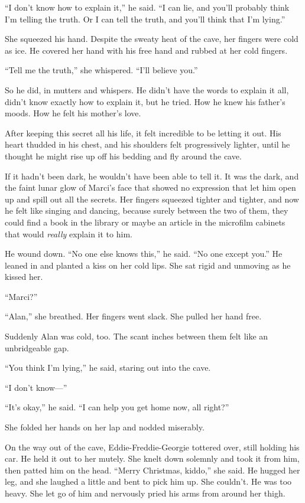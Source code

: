 \documentclass{article}
\begin{document}
``I don't know how to explain it,'' he said.  ``I can lie, and you'll
probably think I'm telling the truth.  Or I can tell the truth, and
you'll think that I'm lying.''

She squeezed his hand.  Despite the sweaty heat of the cave, her
fingers were cold as ice.  He covered her hand with his free hand and
rubbed at her cold fingers.

``Tell me the truth,'' she whispered.  ``I'll believe you.''

So he did, in mutters and whispers.  He didn't have the words to
explain it all, didn't know exactly how to explain it, but he tried. 
How he knew his father's moods.  How he felt his mother's love.

After keeping this secret all his life, it felt incredible to be
letting it out.  His heart thudded in his chest, and his shoulders
felt progressively lighter, until he thought he might rise up off his
bedding and fly around the cave.

If it hadn't been dark, he wouldn't have been able to tell it.  It was
the dark, and the faint lunar glow of Marci's face that showed no
expression that let him open up and spill out all the secrets.  Her
fingers squeezed tighter and tighter, and now he felt like singing and
dancing, because surely between the two of them, they could find a
book in the library or maybe an article in the microfilm cabinets that
would \textit{really} explain it to him.

He wound down.  ``No one else knows this,'' he said.  ``No one except
you.'' He leaned in and planted a kiss on her cold lips.  She sat
rigid and unmoving as he kissed her.

``Marci?''

``Alan,'' she breathed.  Her fingers went slack.  She pulled her hand
free.

Suddenly Alan was cold, too.  The scant inches between them felt like
an unbridgeable gap.

``You think I'm lying,'' he said, staring out into the cave.

``I don't know---''

``It's okay,'' he said.  ``I can help you get home now, all right?''

She folded her hands on her lap and nodded miserably.

On the way out of the cave, Eddie-Freddie-Georgie tottered over, still
holding his car.  He held it out to her mutely.  She knelt down
solemnly and took it from him, then patted him on the head.  ``Merry
Christmas, kiddo,'' she said.  He hugged her leg, and she laughed a
little and bent to pick him up.  She couldn't.  He was too heavy.  She
let go of him and nervously pried his arms from around her thigh.
\end{document}
